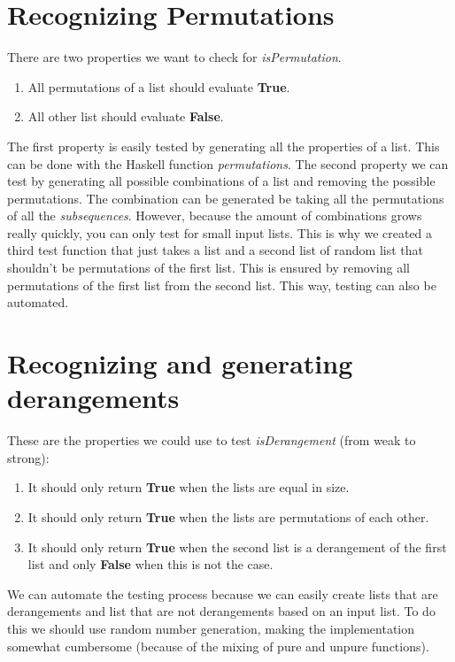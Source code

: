 \documentclass[a4paper]{article}
\begin{document}
\section{Recognizing Permutations}
There are two properties we want to check for \textit{isPermutation}.
\begin{enumerate}
\item All permutations of a list should evaluate \textbf{True}.
\item All other list should evaluate \textbf{False}.
\end{enumerate}
The first property is easily tested by generating all the properties of a list. This can be done with the Haskell function \textit{permutations}. The second property we can test by generating all possible combinations of a list and removing the possible permutations. The combination can be generated be taking all the permutations of all the \textit{subsequences}. However, because the amount of combinations grows really quickly, you can only test for small input lists. This is why we created a third test function that just takes a list and a second list of random list that shouldn't be permutations of the first list. This is ensured by removing all permutations of the first list from the second list. This way, testing can also be automated.

\section{Recognizing and generating derangements}
These are the properties we could use to test \textit{isDerangement} (from weak to strong):
\begin{enumerate}
\item It should only return \textbf{True} when the lists are equal in size.
\item It should only return \textbf{True} when the lists are permutations of each other.
\item It should only return \textbf{True} when the second list is a derangement of the first list and only \textbf{False} when this is not the case.
\end{enumerate}
We can automate the testing process because we can easily create lists that are derangements and list that are not derangements based on an input list. To do this we should use random number generation, making the implementation somewhat cumbersome (because of the mixing of pure and unpure functions).
\end{document}
